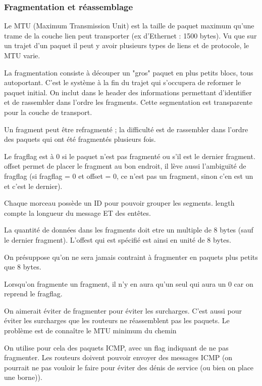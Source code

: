 		\subsubsection{Fragmentation et réassemblage} 		 			
	
	Le MTU (Maximum Transmission Unit) est la taille de paquet maximum qu'une trame de la couche lien peut transporter (ex d'Ethernet : 1500 bytes). Vu que sur un trajet d'un paquet il peut y avoir plusieurs types de liens et de protocole, le MTU varie.
	
		La fragmentation consiste à découper un "gros" paquet en plus petits blocs, tous autoportant. C'est le système à la fin du trajet qui s'occupera de reformer le paquet initial. On inclut dans le header des informations permettant d'identifier et de rassembler dans l'ordre les fragments. Cette segmentation est transparente pour la couche de transport.
	
	Un fragment peut être refragmenté ; la difficulté est de rassembler dans l'ordre des paquets qui ont été fragmentés plusieurs fois.
	
	Le fragflag est à 0 si le paquet n'est pas fragmenté ou s'il est le dernier fragment. offset permet de placer le fragment au bon endroit, il lève aussi l'ambiguïté de fragflag (si fragflag = 0 et offset = 0, ce n'est pas un fragment, sinon c'en est un et c'est le dernier).
	
	Chaque morceau possède un ID pour pouvoir grouper les segments. length compte la longueur du message ET des entêtes.
	
	La quantité de données dans les fragments doit etre un multiple de 8 bytes (sauf le dernier fragment). L'offest qui est spécifié est ainsi en unité de 8 bytes.
	
	
	On présuppose qu'on ne sera jamais contraint à fragmenter en paquets plus petits que 8 bytes.
	
	Lorsqu'on fragmente un fragment, il n'y en aura qu'un seul qui aura un 0 car on reprend le fragflag.
	
	On aimerait éviter de fragmenter pour éviter les surcharges. C'est aussi pour éviter les surcharges que les routeurs ne réassemblent pas les paquets. Le problème est de connaître le MTU minimum du chemin

	On utilise pour cela des paquets ICMP, avec un flag indiquant de ne pas fragmenter. Les routeurs doivent pouvoir envoyer des messages ICMP (on pourrait ne pas vouloir le faire pour éviter des dénis de service (ou bien on place une borne)).
	

